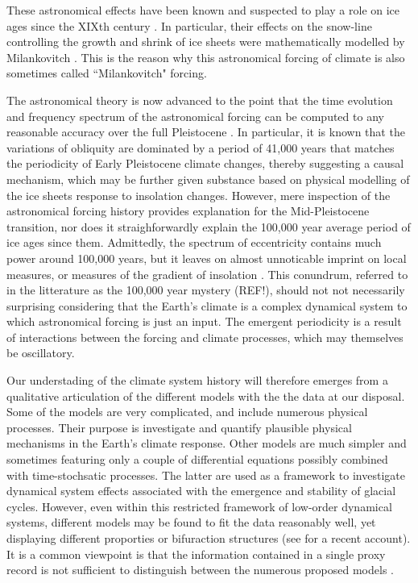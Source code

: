 \documentclass[a4paper,12pt]{article}
\begin{document}
These astronomical effects have been known and suspected to play a role on ice ages since the XIXth century \cite{hershell1882}. In  particular, their effects on the snow-line controlling the growth and shrink of ice sheets were mathematically modelled by Milankovitch \cite{milankovitch41}. This is the reason why this astronomical forcing of climate is also sometimes called ``Milankovitch" forcing. 

The astronomical theory is now advanced to the point that the time evolution and frequency spectrum of the astronomical forcing can be computed to any reasonable accuracy over the full Pleistocene \cite{berge78, laskar04}. In particular, it is known that the variations of obliquity are dominated by a period of 41,000 years that matches the periodicity of Early Pleistocene climate changes, thereby suggesting a causal mechanism, which may be further given substance based on physical modelling of the ice sheets response to insolation changes. 
However, mere inspection of the astronomical forcing history provides explanation for the Mid-Pleistocene transition, nor does it straighforwardly explain the 100,000 year average period of ice ages since them. Admittedly, the spectrum of eccentricity contains much power around 100,000 years, but it leaves on almost unnoticable imprint on local measures, or measures of the gradient of insolation \cite{Berger05aa}. 
This conundrum, referred to in the  litterature as the  100,000 year mystery (REF!), should not 
not necessarily surprising considering that the Earth's climate is a complex dynamical system to which astronomical forcing
is just an input. The emergent periodicity is a result of interactions between the forcing
and climate processes, which may themselves be oscillatory.

Our understading of the climate system history will therefore emerges from a qualitative 
articulation of the different models with the 
the data at our disposal. Some of the models are very complicated, and include numerous
physical processes. Their purpose is investigate and quantify plausible physical mechanisms
in the Earth's climate response. Other models are much simpler and sometimes featuring 
only a couple of differential equations possibly combined with time-stochsatic processes.
The latter are used as a framework to investigate dynamical system effects associated
with the emergence and stability of glacial cycles. 
However, even within this restricted framework of low-order dynamical systems, 
different models may be found to fit the data reasonably well, 
yet displaying different proporties  or bifuraction structures
(see \cite{Crucifix13, DitlevsenXX} for a recent account).
It is a common viewpoint is that the  information contained in a single proxy record is not
sufficient  to distinguish between the numerous proposed models
\cite{Cane2006,Roe1999}.
\end{document}
